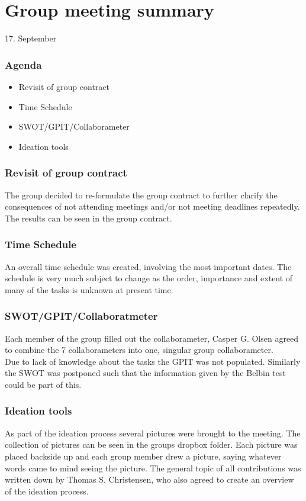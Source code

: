 \documentclass[11pt,a4paper]{article}
\begin{document}
\section{Group meeting summary}
{\LARGE 17. September}

\subsubsection{Agenda}
\begin{itemize}
	\item Revisit of group contract
	\item Time Schedule
	\item SWOT/GPIT/Collaborameter
	\item Ideation tools	
\end{itemize}
\subsubsection{Revisit of group contract}
The group decided to re-formulate the group contract to further clarify the consequences of not attending meetings and/or not meeting deadlines repeatedly. The results can be seen in the group contract.
\subsubsection{Time Schedule}
An overall time schedule was created, involving the most important dates. The schedule is very much subject to change as the order, importance and extent of many of the tasks is unknown at present time.
\subsubsection{SWOT/GPIT/Collaboratmeter}
Each member of the group filled out the collaborameter, Casper G. Olsen agreed to combine the 7 collaborameters into one, singular group collaborameter.\\
Due to lack of knowledge about the tasks the GPIT was not populated. Similarly the SWOT was postponed such that the information given by the Belbin test could be part of this.
\subsubsection{Ideation tools}
As part of the ideation process several pictures were brought to the meeting. The collection of pictures can be seen in the groups dropbox folder. Each picture was placed backside up and each group member drew a picture, saying whatever words came to mind seeing the picture. The general topic of all contributions was written down by Thomas S. Christensen, who also agreed to create an overview of the ideation process.
\end{document}
